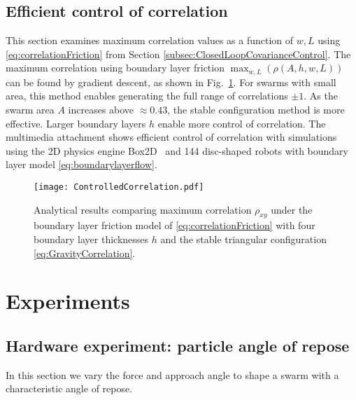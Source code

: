 \subsection{Efficient control of correlation}
This section examines maximum correlation values as a function of  $w,L$ using \eqref{eq:correlationFriction}
from Section  \ref{subsec:ClosedLoopCovarianceControl}. 
The maximum correlation using boundary layer friction $\displaystyle  \max_{w,L} \left( \rho(A,h,w,L) \right)$ can be found by gradient descent, as shown in Fig.~\ref{fig:ControlledCorrelation}. 
For swarms with small area, this method enables generating the full range of correlations $\pm 1$. %
  As  the swarm area $A$ increases above $\approx 0.43$, the stable configuration method is more effective.
Larger boundary layers $h$ enable more control of correlation.
The multimedia attachment shows efficient control of correlation with simulations using the 2D physics engine Box2D~\cite{catto2010box2d} and 144 disc-shaped robots with boundary layer model \eqref{eq:boundarylayerflow}.



\begin{figure}
\begin{center}
	\texttt{[image: ControlledCorrelation.pdf]}
\end{center}
\vspace{-1em}
\caption{\label{fig:ControlledCorrelation}
Analytical results comparing maximum correlation $\rho_{xy}$ under the boundary layer friction model of \eqref{eq:correlationFriction} with four boundary layer thicknesses $h$ and the stable triangular configuration \eqref{eq:GravityCorrelation}.
}\vspace{-1em}
\end{figure}


\section{Experiments}

\subsection{Hardware experiment: particle angle of repose}
In this section we vary the force and approach angle to shape a swarm with a characteristic angle of repose.  



